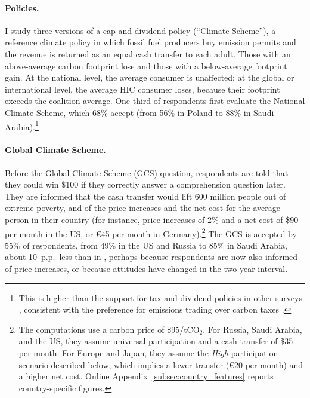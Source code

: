 \documentclass[12pt,english]{article}
\begin{document}
\paragraph{Policies.} I study three versions of a cap-and-dividend policy (``Climate Scheme''), a reference climate policy \citep{grubb_greenhouse_1990,bertram_tradeable_1992,baer_equity_2000,barnes_creating_2008,blanchard_major_2021} in which fossil fuel producers buy emission permits and the revenue is returned as an equal cash transfer to each adult. Those with an above-average carbon footprint lose and those with a below-average footprint gain. At the national level, the average consumer is unaffected; at the global or international level, the average HIC consumer loses, because their footprint exceeds the coalition average. One-third of respondents first evaluate the National Climate Scheme, which 68\% accept (from 56\% in Poland to 88\% in Saudi Arabia).\footnote{This is higher than the support for tax-and-dividend policies in other surveys \citep{douenne_yellow_2022,mildenberger_limited_2022,dechezlepretre_fighting_2025}, consistent with the preference for emissions trading over carbon taxes \citep{funke_prices_2025}.}

\paragraph{Global Climate Scheme.} Before the Global Climate Scheme (GCS) question, respondents are told that they could win \$100 if they correctly answer a comprehension question later. They are informed that the cash transfer would lift 600 million people out of extreme poverty, and of the price increases and the net cost for the average person in their country (for instance, price increases of 2\% and a net cost of \$90 per month in the US, or \euro{}45 per month in Germany).\footnote{The computations use a carbon price of \$95/tCO$_2$. For Russia, Saudi Arabia, and the US, they assume universal participation and a cash transfer of \$35 per month. For Europe and Japan, they assume the \textit{High} participation scenario described below, which implies a lower transfer (\euro{}20 per month) and a higher net cost. Online Appendix~\ref{subsec:country_features} reports country-specific figures.} The GCS is accepted by 55\% of respondents, from 49\% in the US and Russia to 85\% in Saudi Arabia, about 10~p.p.\ less than in \cite{fabre_majority_2025}, perhaps because respondents are now also informed of price increases, or because attitudes have changed in the two-year interval.
\end{document}
